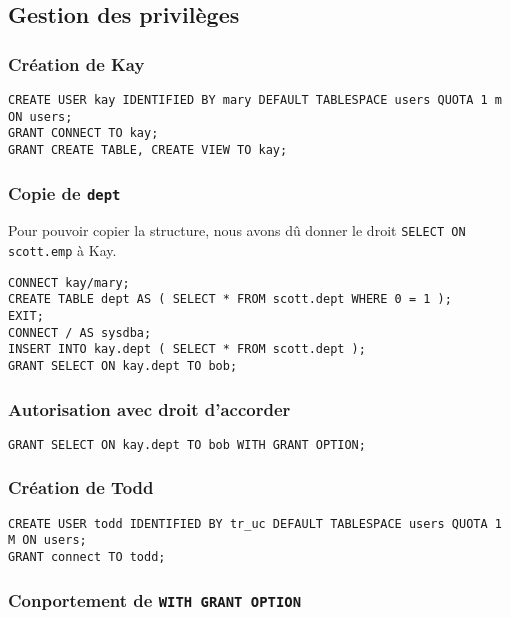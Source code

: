 \subsection{Gestion des privilèges}

\subsubsection{Création de Kay}

\begin{verbatim}
CREATE USER kay IDENTIFIED BY mary DEFAULT TABLESPACE users QUOTA 1 m ON users;
GRANT CONNECT TO kay;
GRANT CREATE TABLE, CREATE VIEW TO kay;
\end{verbatim}

\subsubsection{Copie de \texttt{dept}}

Pour pouvoir copier la structure, nous avons dû donner le droit \verb|SELECT ON scott.emp| à Kay.

\begin{verbatim}
CONNECT kay/mary;
CREATE TABLE dept AS ( SELECT * FROM scott.dept WHERE 0 = 1 );
EXIT;
CONNECT / AS sysdba;
INSERT INTO kay.dept ( SELECT * FROM scott.dept );
GRANT SELECT ON kay.dept TO bob;
\end{verbatim}

\subsubsection{Autorisation avec droit d’accorder}

\begin{verbatim}
GRANT SELECT ON kay.dept TO bob WITH GRANT OPTION;
\end{verbatim}

\subsubsection{Création de Todd}

\begin{verbatim}
CREATE USER todd IDENTIFIED BY tr_uc DEFAULT TABLESPACE users QUOTA 1 M ON users;
GRANT connect TO todd;
\end{verbatim}

\subsubsection{Conportement de \texttt{WITH GRANT OPTION}}

